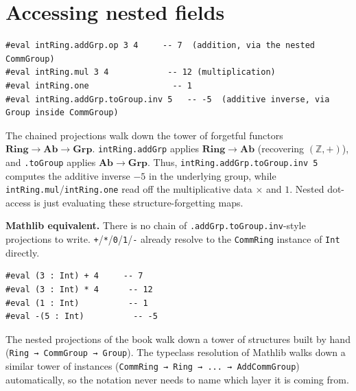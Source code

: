 \section{Accessing nested fields}\label{sec:08-rings:06-accessing-fields:1}

\begin{lstlisting}
#eval intRing.addGrp.op 3 4     -- 7  (addition, via the nested CommGroup)
#eval intRing.mul 3 4            -- 12 (multiplication)
#eval intRing.one                 -- 1
#eval intRing.addGrp.toGroup.inv 5   -- -5  (additive inverse, via Group inside CommGroup)
\end{lstlisting}

\begin{mathreading}

The chained projections walk down the tower of forgetful functors \(\mathbf{Ring} \to \mathbf{Ab} \to \mathbf{Grp}\). \texttt{intRing.addGrp} applies \(\mathbf{Ring}\to\mathbf{Ab}\) (recovering \((\mathbb{Z}, +)\)), and \texttt{.toGroup} applies \(\mathbf{Ab}\to\mathbf{Grp}\). Thus, \texttt{intRing.addGrp.toGroup.inv 5} computes the additive inverse \(-5\) in the underlying group, while \texttt{intRing.mul}/\texttt{intRing.one} read off the multiplicative data \(\times\) and \(1\). Nested dot-access is just evaluating these structure-forgetting maps.

\end{mathreading}

\textbf{Mathlib equivalent.} There is no chain of \texttt{.addGrp.toGroup.inv}-style projections to write. \texttt{+}/\texttt{*}/\texttt{0}/\texttt{1}/\texttt{-\allowbreak{}} already resolve to the \texttt{CommRing} instance of \texttt{Int} directly.

\begin{lstlisting}
#eval (3 : Int) + 4     -- 7
#eval (3 : Int) * 4      -- 12
#eval (1 : Int)          -- 1
#eval -(5 : Int)          -- -5
\end{lstlisting}

The nested projections of the book walk down a tower of structures built by hand (\texttt{Ring → CommGroup → Group}). The typeclass resolution of Mathlib walks down a similar tower of instances (\texttt{CommRing → Ring → ... → AddCommGroup}) automatically, so the notation never needs to name which layer it is coming from.
